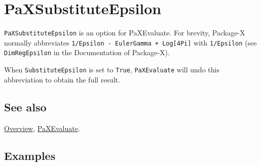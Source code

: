 \documentclass[../FeynHelpersManual.tex]{subfiles}
\begin{document}
\hypertarget{paxsubstituteepsilon}{
\section{PaXSubstituteEpsilon}\label{paxsubstituteepsilon}}

\texttt{PaXSubstituteEpsilon} is an option for PaXEvaluate. For brevity,
Package-X normally abbreviates
\texttt{1/Epsilon - EulerGamma + Log[\allowbreak{}4Pi]} with
\texttt{1/Epsilon} (see \texttt{DimRegEpsilon} in the Documentation of
Package-X).

When \texttt{SubstituteEpsilon} is set to \texttt{True},
\texttt{PaXEvaluate} will undo this abbreviation to obtain the full
result.

\subsection{See also}

\hyperlink{toc}{Overview}, \hyperlink{paxevaluate}{PaXEvaluate}.

\subsection{Examples}
\end{document}
